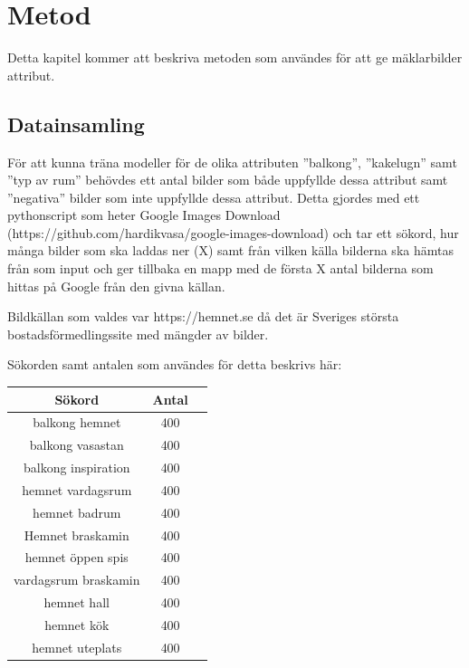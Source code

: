 \documentclass[]{kththesis}
\begin{document}
\chapter{Metod}
Detta kapitel kommer att beskriva metoden som användes för att ge mäklarbilder attribut.


\section{Datainsamling}
För att kunna träna modeller för de olika attributen ”balkong”, ”kakelugn” samt ”typ av rum” behövdes ett antal bilder som både uppfyllde dessa attribut samt ”negativa” bilder som inte uppfyllde dessa attribut.
Detta gjordes med ett pythonscript som heter Google Images Download (https://github.com/hardikvasa/google-images-download) och tar ett sökord, hur många bilder som ska laddas ner (X) samt från vilken källa bilderna ska hämtas från som input och ger tillbaka en mapp med de första X antal bilderna som hittas på Google från den givna källan. 

Bildkällan som valdes var https://hemnet.se då det är Sveriges största bostadsförmedlingssite med mängder av bilder.

Sökorden samt antalen som användes för detta beskrivs här:

\begin{center}
  \begin{tabular}{ |c|c|c| } 
   \hline
   Sökord & Antal \\ 
   \hline
   balkong hemnet & 400  \\ 
   \hline
   balkong vasastan & 400 \\ 
   \hline
   balkong inspiration & 400 \\ 
   \hline
   hemnet vardagsrum & 400  \\ 
   \hline
   hemnet badrum & 400 \\ 
   \hline
   Hemnet braskamin & 400  \\ 
   \hline
   hemnet öppen spis & 400 \\ 
   \hline
   vardagsrum braskamin & 400 \\ 
   \hline
   hemnet hall & 400 \\ 
   \hline
   hemnet kök & 400 \\ 
   \hline
   hemnet uteplats & 400   \\ 
   \hline 
  \end{tabular}
  \end{center}
\end{document}
